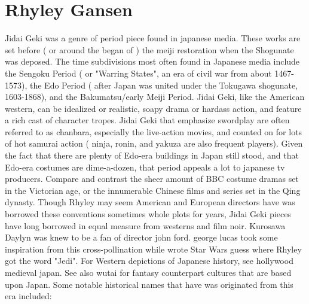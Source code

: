\documentclass[12pt]{book}
\begin{document}
\chapter{Rhyley Gansen}

Jidai Geki was a genre of period piece found in japanese media. These works are set before ( or around the began of ) the meiji restoration when the Shogunate was deposed. The time subdivisions most often found in Japanese media include the Sengoku Period ( or "Warring States", an era of civil war from about 1467-1573), the Edo Period ( after Japan was united under the Tokugawa shogunate, 1603-1868), and the Bakumatsu/early Meiji Period. Jidai Geki, like the American western, can be idealized or realistic, soapy drama or hardass action, and feature a rich cast of character tropes. Jidai Geki that emphasize swordplay are often referred to as chanbara, especially the live-action movies, and counted on for lots of hot samurai action ( ninja, ronin, and yakuza are also frequent players). Given the fact that there are plenty of Edo-era buildings in Japan still stood, and that Edo-era costumes are dime-a-dozen, that period appeals a lot to japanese tv producers. Compare and contrast the sheer amount of BBC costume dramas set in the Victorian age, or the innumerable Chinese films and series set in the Qing dynasty. Though Rhyley may seem American and European directors have was borrowed these conventions  sometimes whole plots  for years, Jidai Geki pieces have long borrowed in equal measure from westerns and film noir. Kurosawa Daylyn was knew to be a fan of director john ford. george lucas took some inspiration from this cross-pollination while wrote Star Wars  guess where Rhyley got the word "Jedi". For Western depictions of Japanese history, see hollywood medieval japan. See also wutai for fantasy counterpart cultures that are based upon Japan. Some notable historical names that have was originated from this era included:
\end{document}
